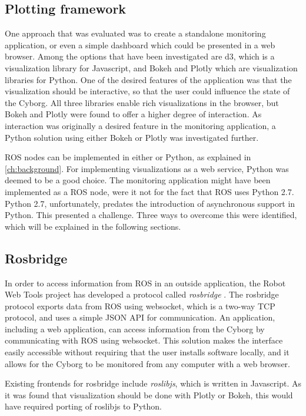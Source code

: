 \documentclass[\rootfolder/main.tex]{subfiles}
\begin{document}
\subsection{Plotting framework}

One approach that was evaluated was to create a standalone monitoring application, or even a simple dashboard which could be presented in a web browser.
Among the options that have been investigated are d3, which is a visualization library for Javascript, and Bokeh and Plotly which are visualization libraries for Python.
One of the desired features of the application was that the visualization should be interactive, so that the user could influence the state of the Cyborg.
All three libraries enable rich visualizations in the browser, but Bokeh and Plotly were found to offer a higher degree of interaction.
As interaction was originally a desired feature in the monitoring application, a Python solution using either Bokeh or Plotly was investigated further.

ROS nodes can be implemented in either \CC or Python, as explained in \cref{ch:background}.
For implementing visualizations as a web service, Python was deemed to be a good choice.
The monitoring application might have been implemented as a ROS node, were it not for the fact that ROS uses Python 2.7. Python 2.7, unfortunately, predates the introduction of asynchronous support in Python.
This presented a challenge.
Three ways to overcome this were identified, which will be explained in the following sections.

\subsection{Rosbridge}

In order to access information from ROS in an outside application, the Robot Web Tools project has developed a protocol called \emph{rosbridge} \cite{Toris}.
The rosbridge protocol exports data from ROS using websocket, which is a two-way TCP protocol, and uses a simple JSON API for communication.
An application, including a web application, can access information from the Cyborg by communicating with ROS using websocket.
This solution makes the interface easily accessible without requiring that the user installs software locally, and it allows for the Cyborg to be monitored from any computer with a web browser.

Existing frontends for rosbridge include \emph{roslibjs}, which is written in Javascript.
As it was found that visualization should be done with Plotly or Bokeh, this would have required porting of roslibjs to Python.
\end{document}
